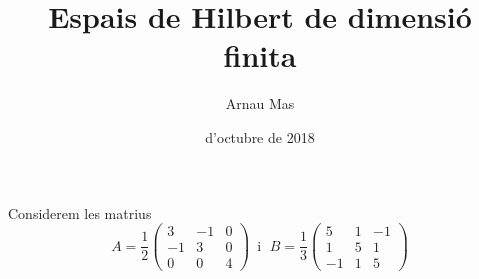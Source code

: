 \documentclass[12pt]{article}
\title{\sffamily {\bfseries Entrega 2:} Espais de Hilbert de dimensió finita}
\author{\sffamily Arnau Mas}
\date{\sffamily 4 d'octubre de 2018}
\numberwithin{table}{section}
\numberwithin{figure}{section}
\numberwithin{equation}{section}
\begin{document}
\maketitle

Considerem les matrius
\begin{equation*}
	A = \frac{1}{2} \begin{pmatrix}
		3 & -1 & 0 \\
		-1 & 3 & 0 \\
		0 & 0 & 4
	\end{pmatrix} \,\text{ i }\;
	B = \frac{1}{3} \begin{pmatrix}
		5 & 1 & -1 \\
		1 & 5 & 1 \\
		-1 & 1 & 5
	\end{pmatrix}
\end{equation*}
\end{document}

